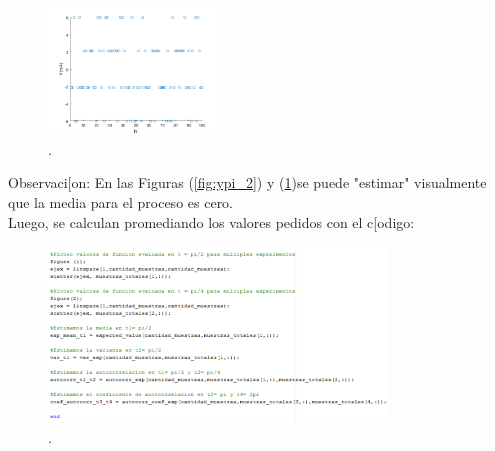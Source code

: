 \begin{figure}[H]
\centering
	\includegraphics[width=0.4\textwidth, trim = {0 0 0 0},clip]{./ImagenesEjercicio1/ypi_4.png}
	\caption{.}
	\label{fig:ypi_4}
\end{figure}

Observaci[on: En las Figuras (\ref{fig:ypi_2}) y (\ref{fig:ypi_4})se puede "estimar" visualmente que la media para el proceso es cero. 
\\
Luego, se calculan promediando los valores pedidos con el c[odigo:

\begin{figure}[H]
\centering
	\includegraphics[width=0.8\textwidth, trim = {0 0 0 0},clip]{./ImagenesEjercicio1/main2.png}
	\caption{.}
	\label{fig:main2}
\end{figure}

